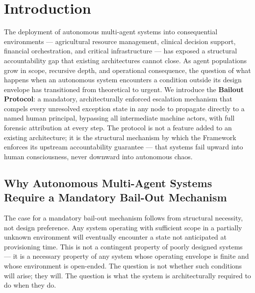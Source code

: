 \section{Introduction}\label{sec:introduction}

The deployment of autonomous multi-agent systems into consequential environments — agricultural resource management, clinical decision support, financial orchestration, and critical infrastructure — has exposed a structural accountability gap that existing architectures cannot close. As agent populations grow in scope, recursive depth, and operational consequence, the question of what happens when an autonomous system encounters a condition outside its design envelope has transitioned from theoretical to urgent. We introduce the \textbf{Bailout Protocol}: a mandatory, architecturally enforced escalation mechanism that compels every unresolved exception state in any \bxthree node to propagate directly to a named human principal, bypassing all intermediate machine actors, with full forensic attribution at every step. The protocol is not a feature added to an existing architecture; it is the structural mechanism by which the \bxthree Framework enforces its upstream accountability guarantee — that \bxthree systems fail upward into human consciousness, never downward into autonomous chaos.

\subsection{Why Autonomous Multi-Agent Systems Require a Mandatory Bail-Out Mechanism}

The case for a mandatory bail-out mechanism follows from structural necessity, not design preference. Any system operating with sufficient scope in a partially unknown environment will eventually encounter a state not anticipated at provisioning time. This is not a contingent property of poorly designed systems — it is a necessary property of any system whose operating envelope is finite and whose environment is open-ended. The question is not whether such conditions will arise; they will. The question is what the system is architecturally required to do when they do.

